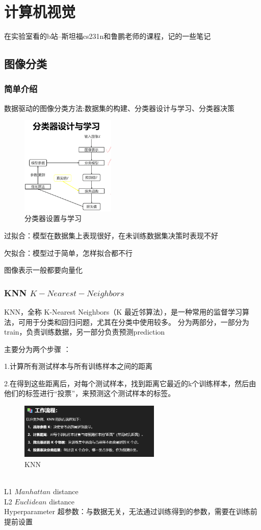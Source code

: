 \documentclass[12pt]{article}
\begin{document}
\section{计算机视觉}
在实验室看的b站--斯坦福cs231n和鲁鹏老师的课程，记的一些笔记
\subsection{图像分类}
\subsubsection{简单介绍}
数据驱动的图像分类方法:数据集的构建、分类器设计与学习、分类器决策

\begin{figure}[ht]  %
\centering
\includegraphics[width=0.4\textwidth]{pic14.png}
\caption{分类器设置与学习}
\end{figure}

过拟合：模型在数据集上表现很好，在未训练数据集决策时表现不好

欠拟合：模型过于简单，怎样拟合都不行

图像表示一般都要向量化

\subsubsection{KNN \(K-Nearest-Neighbors\)}
KNN，全称 K-Nearest Neighbors（K 最近邻算法），是一种常用的监督学习算法，可用于分类和回归问题，尤其在分类中使用较多。
分为两部分，一部分为train，负责训练数据，另一部分负责预测prediction

主要分为两个步骤 ：

1.计算所有测试样本与所有训练样本之间的距离

2.在得到这些距离后，对每个测试样本，找到距离它最近的k个训练样本，然后由他们的标签进行“投票”，来预测这个测试样本的标签。
\begin{figure}[ht]  %
\centering
\includegraphics[width=0.6\textwidth]{pic5.png}
\caption{KNN}
\end{figure}
\\L1 \(Manhattan\) distance
\\L2 \(Euclidean\) distance
\\Hyperparameter 超参数：与数据无关，无法通过训练得到的参数，需要在训练前提前设置
\end{document}
